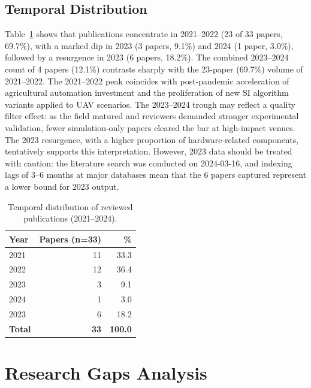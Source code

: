 \documentclass[review,3p,times]{elsarticle}
\begin{document}
\subsection{Temporal Distribution}
Table~\ref{tab:temporal} shows that publications concentrate in 2021--2022 (23 of 33 papers, 69.7\%), with a marked dip in 2023 (3 papers, 9.1\%) and 2024 (1 paper, 3.0\%), followed by a resurgence in 2023 (6 papers, 18.2\%). The combined 2023--2024 count of 4 papers (12.1\%) contrasts sharply with the 23-paper (69.7\%) volume of 2021--2022. The 2021--2022 peak coincides with post-pandemic acceleration of agricultural automation investment and the proliferation of new SI algorithm variants applied to UAV scenarios. The 2023--2024 trough may reflect a quality filter effect: as the field matured and reviewers demanded stronger experimental validation, fewer simulation-only papers cleared the bar at high-impact venues. The 2023 resurgence, with a higher proportion of hardware-related components, tentatively supports this interpretation. However, 2023 data should be treated with caution: the literature search was conducted on 2024-03-16, and indexing lags of 3--6 months at major databases mean that the 6 papers captured represent a lower bound for 2023 output.

\begin{table}[htbp]
\centering
\caption{Temporal distribution of reviewed publications (2021--2024).}
\label{tab:temporal}
\begin{tabular}{lrr}
\toprule
\textbf{Year} & \textbf{Papers (n=33)} & \textbf{\%} \\
\midrule
2021 & 11 & 33.3 \\
2022 & 12 & 36.4 \\
2023 & 3  & 9.1  \\
2024 & 1  & 3.0  \\
2023 & 6  & 18.2 \\
\midrule
\textbf{Total} & \textbf{33} & \textbf{100.0} \\
\bottomrule
\end{tabular}
\end{table}

\section{Research Gaps Analysis}
\end{document}
